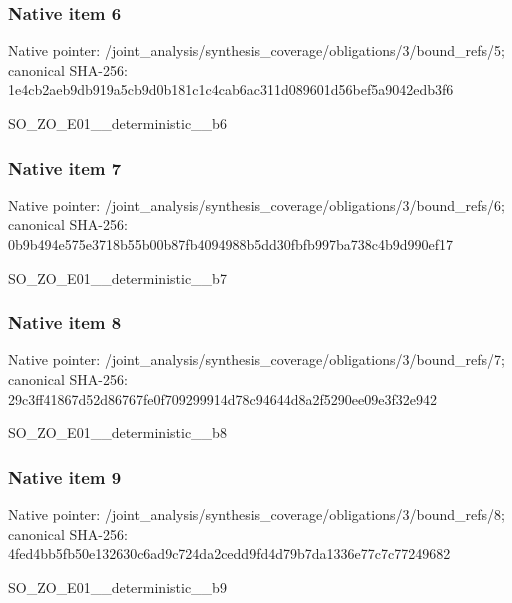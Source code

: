 \documentclass[10pt,a4paper]{article}
\begin{document}
\subsubsection{Native item 6}
Native pointer: /joint\_\allowbreak{}analysis/synthesis\_\allowbreak{}coverage/obligations/3/bound\_\allowbreak{}refs/5; canonical SHA-256: 1e4cb2aeb9db919a5cb9d0b181c1c4cab6ac311d089601d56bef5a9042edb3f6

\begingroup\raggedright\sloppy SO\_\allowbreak{}ZO\_\allowbreak{}E01\_\allowbreak{}\_\allowbreak{}deterministic\_\allowbreak{}\_\allowbreak{}b6\par\endgroup

\subsubsection{Native item 7}
Native pointer: /joint\_\allowbreak{}analysis/synthesis\_\allowbreak{}coverage/obligations/3/bound\_\allowbreak{}refs/6; canonical SHA-256: 0b9b494e575e3718b55b00b87fb4094988b5dd30fbfb997ba738c4b9d990ef17

\begingroup\raggedright\sloppy SO\_\allowbreak{}ZO\_\allowbreak{}E01\_\allowbreak{}\_\allowbreak{}deterministic\_\allowbreak{}\_\allowbreak{}b7\par\endgroup

\subsubsection{Native item 8}
Native pointer: /joint\_\allowbreak{}analysis/synthesis\_\allowbreak{}coverage/obligations/3/bound\_\allowbreak{}refs/7; canonical SHA-256: 29c3ff41867d52d86767fe0f709299914d78c94644d8a2f5290ee09e3f32e942

\begingroup\raggedright\sloppy SO\_\allowbreak{}ZO\_\allowbreak{}E01\_\allowbreak{}\_\allowbreak{}deterministic\_\allowbreak{}\_\allowbreak{}b8\par\endgroup

\subsubsection{Native item 9}
Native pointer: /joint\_\allowbreak{}analysis/synthesis\_\allowbreak{}coverage/obligations/3/bound\_\allowbreak{}refs/8; canonical SHA-256: 4fed4bb5fb50e132630c6ad9c724da2cedd9fd4d79b7da1336e77c7c77249682

\begingroup\raggedright\sloppy SO\_\allowbreak{}ZO\_\allowbreak{}E01\_\allowbreak{}\_\allowbreak{}deterministic\_\allowbreak{}\_\allowbreak{}b9\par\endgroup
\end{document}
